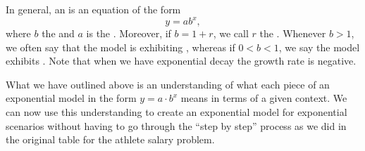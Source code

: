 \documentclass{ximera}
\begin{document}
%
\begin{definition}
In general, an  is an equation of the form 
$$y = ab^x,$$ 
where $b$ the  and $a$ is the . 
Moreover, if $b = 1+r$, we call $r$ the . Whenever $b > 1$, we often say that the model is exhibiting , whereas if \(0 < b < 1\), we say the model exhibits .
Note that when we have exponential decay the growth rate is negative.
\end{definition}
%
What we have outlined above is an understanding of what each piece of an exponential model in the form $y=a\cdot b^x$ means in terms of a given context.  We can now use this understanding to create an exponential model for exponential scenarios without having to go through the ``step by step'' process as we did in the original table for the athlete salary problem.  
%
\end{document}
